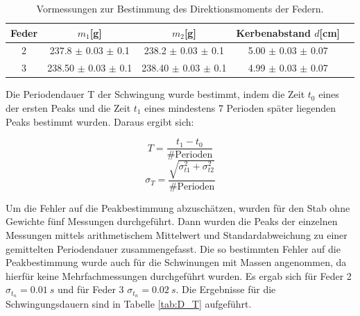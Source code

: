 \documentclass[12pt,a4paper]{article}
\begin{document}
\begin{table}
\caption{Vormessungen zur Bestimmung des Direktionsmoments der Federn.}
\begin{center}
\begin{tabular}{|c|c|c|c|c|}
\hline
Feder & $m_1$[g] & $m_2$[g] & Kerbenabstand $d$[cm]\\
\hline
2 & 237.8 $\pm$ 0.03 $\pm$ 0.1 & 238.2 $\pm$ 0.03 $\pm$ 0.1 & 5.00 $\pm$ 0.03 $\pm$ 0.07 \\
\hline
3 & 238.50 $\pm$ 0.03 $\pm$ 0.1 & 238.40 $\pm$ 0.03 $\pm$ 0.1 & 4.99 $\pm$ 0.03 $\pm$ 0.07\\ 
\hline
\end{tabular}
\end{center}
\label{tab:Vormessungen}
\end{table}



Die Periodendauer T der Schwingung wurde bestimmt, indem die Zeit $t_0$ eines der ersten Peaks und die Zeit $t_1$ eines mindestens 7 Perioden später liegenden Peaks bestimmt wurden. Daraus ergibt sich:

\begin{equation}
T = \frac{t_1 -t_0}{\text{\#Perioden}}
\end{equation}
\begin{equation}
\sigma_T = \frac{\sqrt{\sigma_{t1}^2 + \sigma_{t2}^2}}{\text{\#Perioden}}
\end{equation}

Um die Fehler auf die Peakbestimmung abzuschätzen, wurden für den Stab ohne Gewichte fünf Messungen durchgeführt. Dann wurden die Peaks der einzelnen Messungen mittels arithmetischem Mittelwert und Standardabweichung zu einer gemittelten Periodendauer zusammengefasst. Die so bestimmten Fehler auf die Peakbestimmung wurde auch für die Schwinungen mit Massen angenommen, da hierfür keine Mehrfachmessungen durchgeführt wurden. Es ergab sich für Feder 2 $\sigma_{t_n} = \SI{0.01}{s}$ und für Feder 3 $\sigma_{t_n} = \SI{0.02}{s}$.
Die Ergebnisse für die Schwingungsdauern sind in Tabelle \ref{tab:D_T} aufgeführt.
\end{document}
